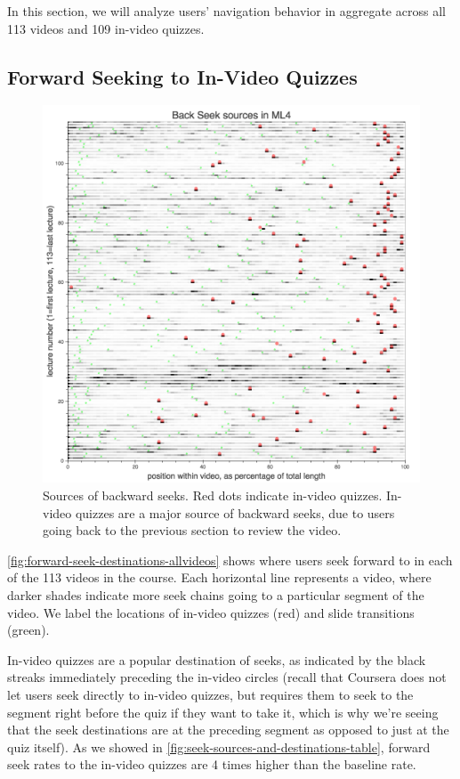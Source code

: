 \documentclass{sigchi}
\begin{document}
In this section, we will analyze users' navigation behavior in aggregate across all 113 videos and 109 in-video quizzes.

\subsection{Forward Seeking to In-Video Quizzes}

\begin{figure}
\includegraphics[width=1.0\columnwidth]{back-seek-sources-allvideos}
\caption{Sources of backward seeks. Red dots indicate in-video quizzes. In-video quizzes are a major source of backward seeks, due to users going back to the previous section to review the video.}
\label{fig:back-seek-sources-allvideos}
\end{figure}

\autoref{fig:forward-seek-destinations-allvideos} shows where users seek forward to in each of the 113 videos in the course. Each horizontal line represents a video, where darker shades indicate more seek chains going to a particular segment of the video. We label the locations of in-video quizzes (red) and slide transitions (green). %

In-video quizzes are a popular destination of seeks, as indicated by the black streaks immediately preceding the in-video circles (recall that Coursera does not let users seek directly to in-video quizzes, but requires them to seek to the segment right before the quiz if they want to take it, which is why we're seeing that the seek destinations are at the preceding segment as opposed to just at the quiz itself). As we showed in \autoref{fig:seek-sources-and-destinations-table}, forward seek rates to the in-video quizzes are 4 times higher than the baseline rate.
\end{document}
